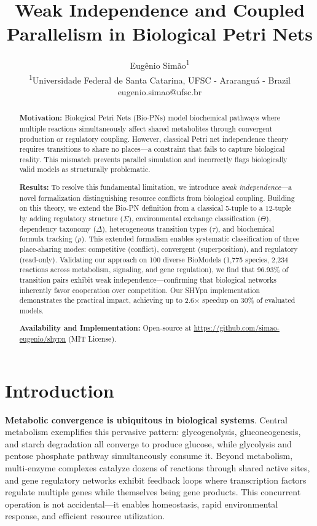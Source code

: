 \documentclass[twocolumn,11pt]{article}
\title{\textbf{Weak Independence and Coupled Parallelism in Biological Petri Nets}}
\author{
Eugênio Simão\textsuperscript{1}\\
\textsuperscript{1}Universidade Federal de Santa Catarina, UFSC - Araranguá - Brazil\\
eugenio.simao@ufsc.br
}
\date{}
\begin{document}
\maketitle

\begin{abstract}
\textbf{Motivation:} Biological Petri Nets (Bio-PNs) model biochemical pathways where multiple reactions simultaneously affect shared metabolites through convergent production or regulatory coupling. However, classical Petri net independence theory requires transitions to share no places---a constraint that fails to capture biological reality. This mismatch prevents parallel simulation and incorrectly flags biologically valid models as structurally problematic.

\textbf{Results:} To resolve this fundamental limitation, we introduce \emph{weak independence}---a novel formalization distinguishing resource conflicts from biological coupling. Building on this theory, we extend the Bio-PN definition from a classical 5-tuple to a 12-tuple by adding regulatory structure ($\Sigma$), environmental exchange classification ($\Theta$), dependency taxonomy ($\Delta$), heterogeneous transition types ($\tau$), and biochemical formula tracking ($\rho$). This extended formalism enables systematic classification of three place-sharing modes: competitive (conflict), convergent (superposition), and regulatory (read-only). Validating our approach on 100 diverse BioModels (1,775 species, 2,234 reactions across metabolism, signaling, and gene regulation), we find that 96.93\% of transition pairs exhibit weak independence---confirming that biological networks inherently favor cooperation over competition. Our SHYpn implementation demonstrates the practical impact, achieving up to 2.6$\times$ speedup on 30\% of evaluated models.

\textbf{Availability and Implementation:} Open-source at \url{https://github.com/simao-eugenio/shypn} (MIT License).
\end{abstract}

\section{Introduction}

\textbf{Metabolic convergence is ubiquitous in biological systems}. Central metabolism exemplifies this pervasive pattern: glycogenolysis, gluconeogenesis, and starch degradation all converge to produce glucose, while glycolysis and pentose phosphate pathway simultaneously consume it. Beyond metabolism, multi-enzyme complexes catalyze dozens of reactions through shared active sites, and gene regulatory networks exhibit feedback loops where transcription factors regulate multiple genes while themselves being gene products. This concurrent operation is not accidental---it enables homeostasis, rapid environmental response, and efficient resource utilization.
\end{document}
